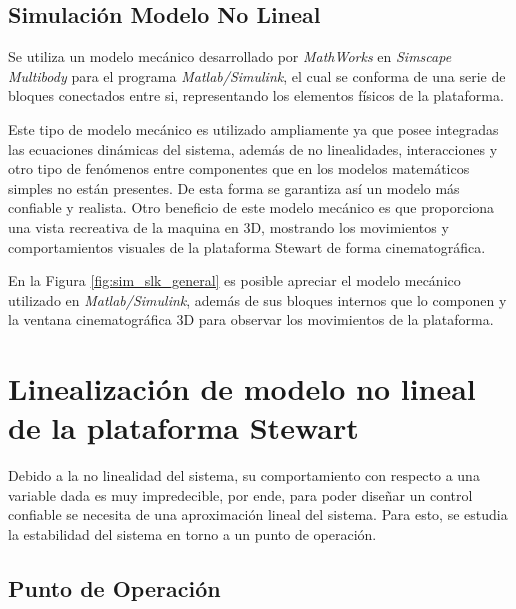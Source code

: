 \subsection{Simulación Modelo No Lineal}

Se utiliza un modelo mecánico desarrollado por \textit{MathWorks} en \textit{Simscape Multibody} para el programa \textit{Matlab/Simulink}, el cual se conforma de una serie de bloques conectados entre si, representando los elementos físicos de la plataforma.

Este tipo de modelo mecánico es utilizado ampliamente ya que posee integradas las ecuaciones dinámicas del sistema, además de no linealidades, interacciones y otro tipo de fenómenos entre componentes que en los modelos matemáticos simples no están presentes. De esta forma se garantiza así un modelo más confiable y realista. Otro beneficio de este modelo mecánico es que proporciona una vista recreativa de la maquina en 3D, mostrando los movimientos y comportamientos visuales de la plataforma Stewart de forma cinematográfica. 

En la Figura \ref{fig:sim_slk_general} es posible apreciar el modelo mecánico utilizado en \textit{Matlab/Simulink}, además de sus bloques internos que lo componen y la ventana cinematográfica 3D para observar los movimientos de la plataforma.



\section{Linealización de modelo no lineal de la plataforma Stewart}
\label{sec:linealizacion_stewart}

Debido a la no linealidad del sistema, su comportamiento con respecto a una variable dada es muy impredecible, por ende, para poder diseñar un control confiable se necesita de una aproximación lineal del sistema. Para esto, se estudia la estabilidad del sistema en torno a un punto de operación. 

\subsection{Punto de Operación}

